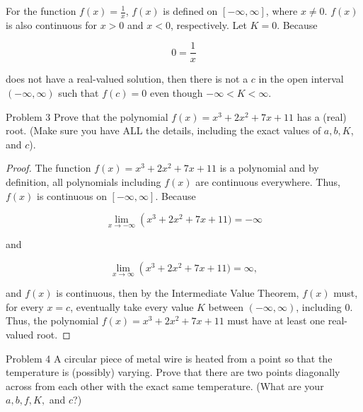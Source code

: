 \documentclass{article}
\begin{document}
    For the function $f(x)=\frac{1}{x}$, $f(x)$ is defined on $[-\infty, \infty]$, where $x\not = 0$. $f(x)$ is also continuous for $x>0$ and $x<0$, respectively. Let $K=0$. Because

    \[
        0 = \frac{1}{x}
    \]

    does not have a real-valued solution, then there is not a $c$ in the open interval $(-\infty, \infty)$ such that $f(c)=0$ even though $-\infty<K<\infty$.

    \begin{tbhtheorem}{Problem 3}
        Prove that the polynomial $f(x)=x^3 + 2x^2 + 7x + 11$ has a (real) root. (Make sure you have ALL the details, including the exact values of $a,b,K$, and $c$).
    \end{tbhtheorem}

    \begin{proof}
        The function $f(x)=x^3+2x^2+7x+11$ is a polynomial and by definition, all polynomials including $f(x)$ are continuous everywhere. Thus, $f(x)$ is continuous on $[-\infty, \infty]$. Because

        \[
            \lim_{x\to -\infty} \left(x^3+2x^2+7x+11) = -\infty
        \]

        and

        \[
            \lim_{x\to \infty} \left(x^3+2x^2+7x+11) = \infty,
        \]

        and $f(x)$ is continuous, then by the Intermediate Value Theorem, $f(x)$ must, for every $x=c$, eventually take every value $K$ between $(-\infty, \infty)$, including 0.
        Thus, the polynomial $f(x)=x^3+2x^2+7x+11$ must have at least one real-valued root.
    \end{proof}


    \pagebreak
    \thispagestyle{page3}

    \begin{tbhtheorem}{Problem 4}
        A circular piece of metal wire is heated from a point so that the temperature is (possibly) varying. Prove that there are two points diagonally across from each other with the exact same temperature.
        (What are your $a,b,f,K,$ and $c$?)
    \end{tbhtheorem}
\end{document}
